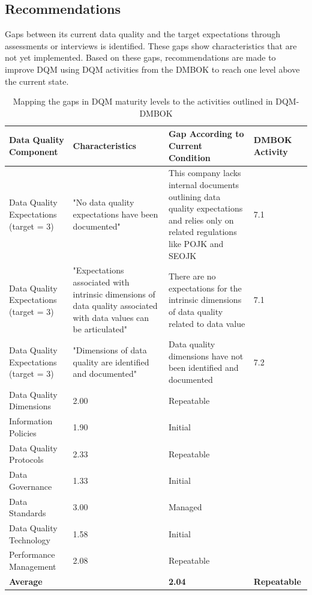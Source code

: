 \documentclass[conference]{IEEEtran}
\begin{document}
\subsection{Recommendations}
Gaps between its current data quality and the target expectations through assessments or interviews is identified. These gaps show characteristics that are not yet implemented. Based on these gaps, recommendations are made to improve DQM using DQM activities from the DMBOK to reach one level above the current state.

\begin{table}[h]
\caption{Mapping the gaps in DQM maturity levels to the activities outlined in DQM-DMBOK}
\label{tab:mapping}
\centering
\begin{tabular}{|p{2cm}|p{5cm}|p{5cm}|p{2cm}|}
\hline
\textbf{Data Quality Component} & \textbf{Characteristics} & \textbf{Gap According to Current Condition} & \textbf{DMBOK Activity} \\
\hline
Data Quality Expectations (target = 3) & "No data quality expectations have been documented" & This company lacks internal documents outlining data quality expectations and relies only on related regulations like POJK and SEOJK & 7.1 \\
\hline
Data Quality Expectations (target = 3) & "Expectations associated with intrinsic dimensions of data quality associated with data values can be articulated" & There are no expectations for the intrinsic dimensions of data quality related to data value & 7.1 \\
\hline
Data Quality Expectations (target = 3) & "Dimensions of data quality are identified and documented" & Data quality dimensions have not been identified and documented & 7.2 \\
\hline
Data Quality Dimensions & 2.00 & Repeatable & \\
\hline
Information Policies & 1.90 & Initial & \\
\hline
Data Quality Protocols & 2.33 & Repeatable & \\
\hline
Data Governance & 1.33 & Initial & \\
\hline
Data Standards & 3.00 & Managed & \\
\hline
Data Quality Technology & 1.58 & Initial & \\
\hline
Performance Management & 2.08 & Repeatable & \\
\hline
\multicolumn{2}{|l|}{\textbf{Average}} & \textbf{2.04} & \textbf{Repeatable} \\
\hline
\end{tabular}
\end{table}
\end{document}
